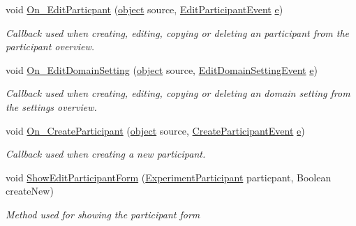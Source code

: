\begin{DoxyCompactItemize}
void \hyperlink{class_web_analyzer_1_1_controller_1_1_main_controller_aec177eebdda59cf460a762d1a10f0248}{On\+\_\+\+Edit\+Particpant} (\hyperlink{_u_i_2_h_t_m_l_resources_2js_2lib_2underscore_8min_8js_aae18b7515bb2bc4137586506e7c0c903}{object} source, \hyperlink{class_web_analyzer_1_1_events_1_1_edit_participant_event}{Edit\+Participant\+Event} \hyperlink{_u_i_2_h_t_m_l_resources_2js_2lib_2bootstrap_8min_8js_ab5902775854a8b8440bcd25e0fe1c120}{e})
\begin{DoxyCompactList}\small\item\em Callback used when creating, editing, copying or deleting an participant from the participant overview. \end{DoxyCompactList}\item 
void \hyperlink{class_web_analyzer_1_1_controller_1_1_main_controller_a42a7cdc67bd00b52cb7a8eb4f53e4262}{On\+\_\+\+Edit\+Domain\+Setting} (\hyperlink{_u_i_2_h_t_m_l_resources_2js_2lib_2underscore_8min_8js_aae18b7515bb2bc4137586506e7c0c903}{object} source, \hyperlink{class_web_analyzer_1_1_events_1_1_edit_domain_setting_event}{Edit\+Domain\+Setting\+Event} \hyperlink{_u_i_2_h_t_m_l_resources_2js_2lib_2bootstrap_8min_8js_ab5902775854a8b8440bcd25e0fe1c120}{e})
\begin{DoxyCompactList}\small\item\em Callback used when creating, editing, copying or deleting an domain setting from the settings overview. \end{DoxyCompactList}\item 
void \hyperlink{class_web_analyzer_1_1_controller_1_1_main_controller_a4937c92cdc2be045640d8a524ac1adb8}{On\+\_\+\+Create\+Participant} (\hyperlink{_u_i_2_h_t_m_l_resources_2js_2lib_2underscore_8min_8js_aae18b7515bb2bc4137586506e7c0c903}{object} source, \hyperlink{class_web_analyzer_1_1_events_1_1_create_participant_event}{Create\+Participant\+Event} \hyperlink{_u_i_2_h_t_m_l_resources_2js_2lib_2bootstrap_8min_8js_ab5902775854a8b8440bcd25e0fe1c120}{e})
\begin{DoxyCompactList}\small\item\em Callback used when creating a new participant. \end{DoxyCompactList}\item 
void \hyperlink{class_web_analyzer_1_1_controller_1_1_main_controller_a1aec7be20aaeb09601a78b1568783ca9}{Show\+Edit\+Participant\+Form} (\hyperlink{class_web_analyzer_1_1_models_1_1_base_1_1_experiment_participant}{Experiment\+Participant} particpant, Boolean create\+New)
\begin{DoxyCompactList}\small\item\em Method used for showing the participant form \end{DoxyCompactList}\item 

\end{DoxyCompactItemize}
